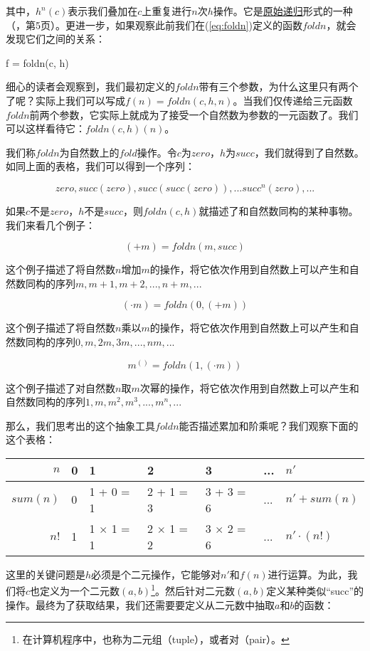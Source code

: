 \documentclass[UTF8]{article}
\begin{document}
其中，$h^n(c)$表示我们叠加在$c$上重复进行$n$次$h$操作。它是\underline{原始递归}形式的一种（\cite{Bird97}，第5页）。更进一步，如果观察此前我们在(\ref{eq:foldn})定义的函数$foldn$，就会发现它们之间的关系：

\be
f = foldn(c, h)
\ee

细心的读者会观察到，我们最初定义的$foldn$带有三个参数，为什么这里只有两个了呢？实际上我们可以写成$f(n) = foldn(c, h, n)$。当我们仅传递给三元函数$foldn$前两个参数，它实际上就成为了接受一个自然数为参数的一元函数了。我们可以这样看待它：$foldn(c, h)(n)$。

我们称$foldn$为自然数上的$fold$操作。令$c$为$zero$，$h$为$succ$，我们就得到了自然数。如同上面的表格，我们可以得到一个序列：

\[
zero, succ(zero), succ(succ(zero)), ... succ^n(zero), ...
\]

如果$c$不是$zero$，$h$不是$succ$，则$foldn(c, h)$就描述了和自然数同构的某种事物。我们来看几个例子：

\[
(+ m) = foldn(m, succ)
\]

这个例子描述了将自然数$n$增加$m$的操作，将它依次作用到自然数上可以产生和自然数同构的序列$m, m + 1, m + 2, ..., n + m, ...$

\[
(\cdot m) = foldn(0, (+ m))
\]

这个例子描述了将自然数$n$乘以$m$的操作，将它依次作用到自然数上可以产生和自然数同构的序列$0, m, 2m, 3m, ..., nm, ...$

\[
m^{()} = foldn(1, (\cdot m))
\]

这个例子描述了对自然数$n$取$m$次幂的操作，将它依次作用到自然数上可以产生和自然数同构的序列$1, m, m^2, m^3, ..., m^n, ...$

那么，我们思考出的这个抽象工具$foldn$能否描述累加和阶乘呢？我们观察下面的这个表格：

\begin{tabular}{r|l|l|l|l|l|l}
$n$ & 0 & 1 & 2 & 3 & ... & $n'$ \\
\hline
$sum(n)$ & 0 & 1 + 0 = 1 & 2 + 1 = 3 & 3 + 3 = 6 & ... & $n' + sum(n)$ \\
\hline
$n!$ & 1 & 1 $\times$ 1 = 1 & 2 $\times$ 1 = 2 & 3 $\times$ 2 = 6 & ... & $n' \cdot (n!)$
\end{tabular}

这里的关键问题是$h$必须是个二元操作，它能够对$n'$和$f(n)$进行运算。为此，我们将$c$也定义为一个二元数$(a, b)$\footnote{在计算机程序中，也称为二元组（tuple），或者对（pair）。}。然后针对二元数$(a, b)$定义某种类似“succ”的操作。最终为了获取结果，我们还需要要定义从二元数中抽取$a$和$b$的函数：
\end{document}
